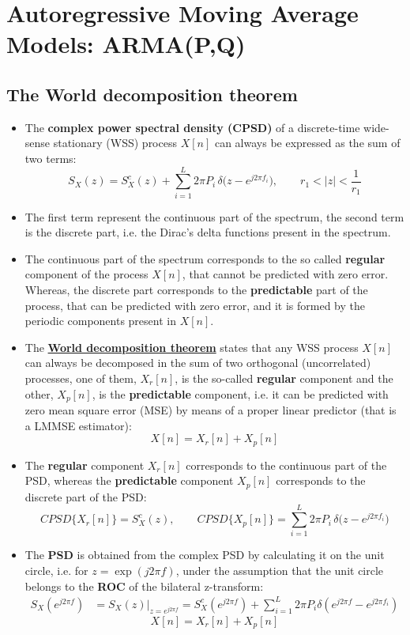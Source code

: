 

\section{Autoregressive Moving Average Models: ARMA(P,Q)}
\subsection{The World decomposition theorem}
\begin{itemize}
    \item The \textbf{complex power spectral density (CPSD)} of a discrete-time wide-sense stationary (WSS) process \(X[n]\) can always be expressed as the sum of two terms:
\[
S_{X}(z)
= S_{X}^{c}(z)
  + \sum_{i=1}^{L} 2\pi P_i
    \,\delta\!\bigl(z - e^{j2\pi f_i}\bigr),
\qquad
r_{1} < |z| < \frac{1}{r_{1}}
\]


    \item The first term represent the continuous part of the spectrum, the second term is the discrete part, i.e. the Dirac's delta functions present in the spectrum.
    \item The continuous part of the spectrum corresponds to the so called \textbf{regular} component of the process \(X[n]\), that cannot be predicted with zero error. Whereas, the discrete part corresponds to the \textbf{predictable} part of the process, that can be predicted with zero error, and it is formed by the periodic components present in \(X[n]\).
    \item The \textbf{\underline{World decomposition theorem}} states that any WSS process \(X[n]\) can always be decomposed in the sum of two orthogonal (uncorrelated) processes, one of them, \(X_r[n]\), is the so-called \textbf{regular} component and the other, \(X_p[n]\), is the \textbf{predictable} component, i.e. it can be predicted with zero mean square error (MSE) by means of a proper linear predictor (that is a LMMSE estimator):
    \[
    X[n]=X_r[n]+X_p[n]
    \]
    \item The \textbf{regular} component \(X_r[n]\) corresponds to the continuous part of the PSD, whereas the \textbf{predictable} component \(X_p[n]\) corresponds to the discrete part of the PSD:
\[
CPSD\{X_{r}[n]\} = S_{X}^{c}(z),
\qquad
CPSD\{X_{p}[n]\}
= \sum_{i=1}^{L} 2\pi P_i\,
  \delta\!\bigl(z - e^{j2\pi f_i}\bigr)
\]

    \item The \textbf{PSD} is obtained from the complex PSD by calculating it on the unit circle, i.e. for \(z=\exp(j2\pi f)\), under the assumption that the unit circle belongs to the \textbf{ROC} of the bilateral z-transform:
\begin{align*}
S_{X}\!\left(e^{j2\pi f}\right)
&= S_{X}(z)\big|_{z=e^{j2\pi f}}
 = S_{X}^{c}\!\left(e^{j2\pi f}\right)
   + \sum_{i=1}^{L} 2\pi P_i
     \delta\!\left(e^{j2\pi f} - e^{j2\pi f_i}\right)
\end{align*}
\[
X[n] = X_{r}[n] + X_{p}[n]
\]


\end{itemize}
